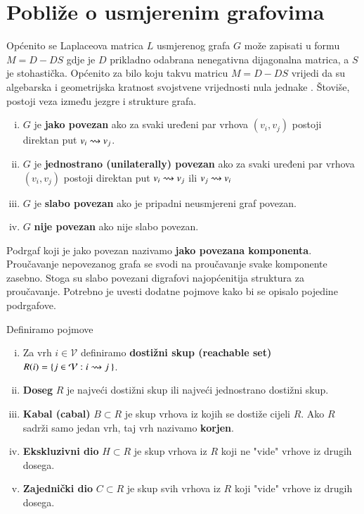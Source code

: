 \section[Pobliže o usmjerenim grafovima][Pobliže o usmjerenim grafovima]{Pobliže o usmjerenim grafovima}
Općenito se Laplaceova matrica $L$ usmjerenog grafa $G$ može zapisati u formu $M = D-DS$ gdje je $D$ prikladno odabrana nenegativna dijagonalna matrica, a $S$ je stohastička. Općenito za bilo koju takvu matricu $M = D-DS$ vrijedi da su algebarska i geometrijska kratnost svojstvene vrijednosti nula jednake \cite{DiGraph_Kernel}. Štoviše, postoji veza između jezgre i strukture grafa.
\begin{defn}
    \begin{enumerate}[i.)] Neka je $G$ usmjeren težinski graf.
  \item $G$ je \textbf{jako povezan} ako za svaki uređeni par vrhova $(v_i, v_j)$ postoji direktan put $v_i \rightsquigarrow v_j$.
  \item $G$ je \textbf{jednostrano (unilaterally) povezan} ako za svaki uređeni par vrhova $(v_i, v_j)$ postoji direktan put $v_i \rightsquigarrow v_j$ ili $v_j \rightsquigarrow v_i$
  \item $G$ je \textbf{slabo povezan} ako je pripadni neusmjereni graf povezan.
  \item $G$ \textbf{nije povezan} ako nije slabo povezan.
\end{enumerate}
\end{defn}
Podrgaf koji je jako povezan nazivamo \textbf{jako povezana komponenta}.
Proučavanje nepovezanog grafa se svodi na proučavanje svake komponente zasebno. Stoga su slabo povezani digrafovi najopćenitija struktura za proučavanje.
Potrebno je uvesti dodatne pojmove kako bi se opisalo pojedine podrgafove.

\begin{defn}Definiramo pojmove
    \begin{enumerate}[i.)]
        \item Za vrh $i \in \mathcal{V}$ definiramo \textbf{dostižni skup (reachable set)} $R(i) = \{ j \in \mathcal{V} : i \rightsquigarrow j \:\}$.
        \item \textbf{Doseg} $R$ je najveći dostižni skup ili najveći jednostrano dostižni skup.
        \item \textbf{Kabal (cabal)} $B \subset R$ je skup vrhova iz kojih se dostiže cijeli $R$. Ako $R$ sadrži samo jedan vrh, taj vrh nazivamo \textbf{korjen}.
        \item \textbf{Ekskluzivni dio} $H \subset R$ je skup vrhova iz $R$ koji ne "vide" vrhove iz drugih dosega.
        \item \textbf{Zajednički dio} $C \subset R$ je skup svih vrhova iz $R$ koji "vide" vrhove iz drugih dosega.
    \end{enumerate}
\end{defn}

